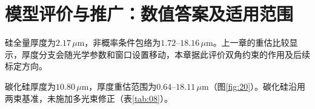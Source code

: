 \section{模型评价与推广：数值答案及适用范围}

硅全量厚度为$2.17\,\mu\mathrm{m}$，非概率条件包络为$1.72$--$18.16\,\mu\mathrm{m}$。上一章的重估比较显示，厚度分支会随光学参数和窗口设置移动，本章据此评价双角约束的作用及后续标定方向。

碳化硅厚度为$10.80\,\mu\mathrm{m}$，厚度重估范围为$0.64$--$18.11\,\mu\mathrm{m}$（图\ref{fig:20}）。碳化硅沿用两束基准，未施加多光束修正（表\ref{tab:08}）。


